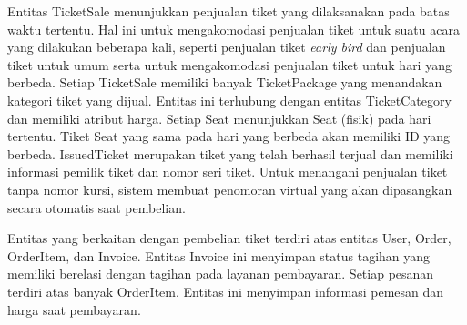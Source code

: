 Entitas TicketSale menunjukkan penjualan tiket yang dilaksanakan pada batas waktu tertentu. Hal ini untuk mengakomodasi penjualan tiket untuk suatu acara yang dilakukan beberapa kali, seperti penjualan tiket \textit{early bird} dan penjualan tiket untuk umum serta untuk mengakomodasi penjualan tiket untuk hari yang berbeda. Setiap TicketSale memiliki banyak TicketPackage yang menandakan kategori tiket yang dijual. Entitas ini terhubung dengan entitas TicketCategory dan memiliki atribut harga. Setiap Seat menunjukkan Seat (fisik) pada hari tertentu. Tiket Seat yang sama pada hari yang berbeda akan memiliki ID yang berbeda. IssuedTicket merupakan tiket yang telah berhasil terjual dan memiliki informasi pemilik tiket dan nomor seri tiket. Untuk menangani penjualan tiket tanpa nomor kursi, sistem membuat penomoran virtual yang akan dipasangkan secara otomatis saat pembelian.

Entitas yang berkaitan dengan pembelian tiket terdiri atas entitas User, Order, OrderItem, dan Invoice. Entitas Invoice ini menyimpan status tagihan yang memiliki berelasi dengan tagihan pada layanan pembayaran. Setiap pesanan terdiri atas banyak OrderItem. Entitas ini menyimpan informasi pemesan dan harga saat pembayaran.

